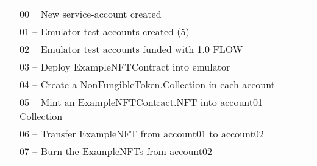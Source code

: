 \documentclass[../main.tex]{subfiles}
\begin{document}
\begin{table}[ht]
{\begin{tabular}{lllllll}
            \multicolumn{1}{l|}{}                              & \multicolumn{6}{l|}{00 – New service-account created}                                                                                                                                                                                                                            \\ \cline{2-7}
            \multicolumn{1}{l|}{}                              & \multicolumn{6}{l|}{01 – Emulator test accounts created (5)}                                                                                                                                                                                                                     \\ \cline{2-7}
            \multicolumn{1}{l|}{}                              & \multicolumn{6}{l|}{02 – Emulator test accounts funded with 1.0 FLOW}                                                                                                                                                                                                            \\ \cline{2-7}
            \multicolumn{1}{l|}{}                              & \multicolumn{6}{l|}{03 – Deploy ExampleNFTContract into emulator}                                                                                                                                                                                                                \\ \cline{2-7}
            \multicolumn{1}{l|}{}                              & \multicolumn{6}{l|}{04 – Create a NonFungibleToken.Collection in each account}                                                                                                                                                                                                   \\ \cline{2-7}
            \multicolumn{1}{l|}{}                              & \multicolumn{6}{l|}{05 – Mint an ExampleNFTContract.NFT into account01 Collection}                                                                                                                                                                                               \\ \cline{2-7}
            \multicolumn{1}{l|}{}                              & \multicolumn{6}{l|}{06 – Transfer ExampleNFT from account01 to account02}                                                                                                                                                                                                        \\ \cline{2-7}
            \multicolumn{1}{l|}{}                              & \multicolumn{6}{l|}{07 – Burn the ExampleNFTs from account02}                                                                                                                                                                                                                    \\ \cline{2-7}
        \end{tabular}%
    }
\end{table}
\end{document}
